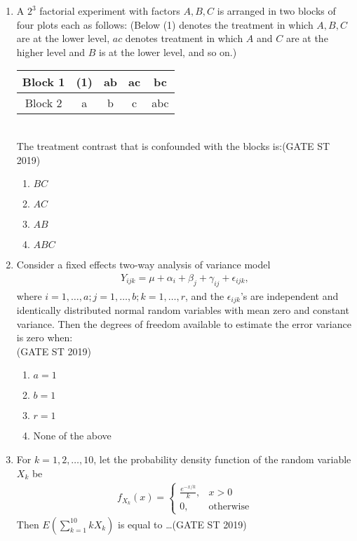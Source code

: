 \documentclass[journal]{IEEEtran}
\begin{document}
\begin{enumerate}[start=1]
\item A \(2^3\) factorial experiment with factors \(A, B, C\) is arranged in two blocks of four plots each as follows: (Below (1) denotes the treatment in which \(A, B, C\) are at the lower level, \(ac\) denotes treatment in which \(A\) and \(C\) are at the higher level and \(B\) is at the lower level, and so on.)

\begin{tabular}{|c|c|c|c|c|}
\hline
Block 1 & (1) & ab & ac & bc \\
\hline
Block 2 & a & b  & c & abc \\
\hline
\end{tabular}\\

The treatment contrast that is confounded with the blocks is:\hfill(GATE ST 2019)
\begin{multicols}{4}
\begin{enumerate}
\item \(BC\)
\item \(AC\)
\item \(AB\)
\item \(ABC\)
\end{enumerate}
\end{multicols}

\item Consider a fixed effects two-way analysis of variance model
\begin{align*}
Y_{ijk} = \mu + \alpha_i + \beta_j + \gamma_{ij} + \epsilon_{ijk},
\end{align*}
where \(i=1,\ldots, a; j=1,\ldots,b; k=1,\ldots,r\), and the \(\epsilon_{ijk}\)'s are independent and identically distributed normal random variables with mean zero and constant variance. Then the degrees of freedom available to estimate the error variance is zero when:\\
\hspace*{15.7cm}(GATE ST 2019)
\begin{enumerate}
\item \(a=1\)
\item \(b=1\)
\item \(r=1\)
\item None of the above
\end{enumerate}



\item For \(k = 1, 2, \ldots, 10\), let the probability density function of the random variable \(X_k\) be
\begin{align*}
f_{X_k}(x) = \begin{cases}
\frac{e^{-x/k}}{k}, & x > 0 \\
0, & \text{otherwise}
\end{cases}
\end{align*}
Then \(E\left(\sum_{k=1}^{10} k X_k\right)\) is equal to \ldots \hfill(GATE ST 2019)


\end{enumerate}
\end{document}
